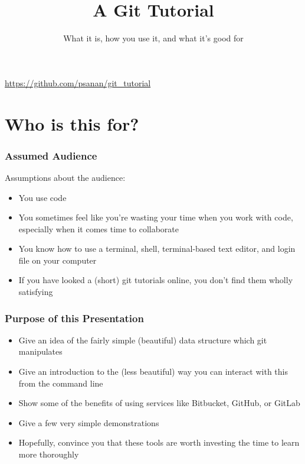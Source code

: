 


\title{A Git Tutorial}
\subtitle[]{What it is, how you use it, and what it's good for}
\date[]{}





\begin{frame}[fragile]
\titlepage
\begin{center}
\href{https://github.com/psanan/git_tutorial}{https://github.com/psanan/git\_tutorial}
\end{center}
\end{frame}


\begin{frame}
\tableofcontents
\end{frame}

\section{Who is this for?}
\begin{frame}[fragile]
\frametitle{Assumed Audience}
Assumptions about the audience:
\begin{itemize}
\item You use code
\item You sometimes feel like you're wasting your time when you work with code, especially when it comes time to collaborate
\item You know how to use a terminal, shell, terminal-based text editor, and login file on your computer
\item If you have looked a (short) git tutorials online, you don't find them wholly satisfying
\end{itemize}
\end{frame}

\begin{frame}[fragile]
\frametitle{Purpose of this Presentation}
\begin{itemize}
\item Give an idea of the fairly simple (beautiful) data structure which git manipulates
\item Give an introduction to the (less beautiful) way you can interact with this from the command line
\item Show some of the benefits of using services like Bitbucket, GitHub, or GitLab
\item Give a few very simple demonstrations
\item Hopefully, convince you that these tools are worth investing the time to learn more thoroughly
\end{itemize}
\end{frame}

